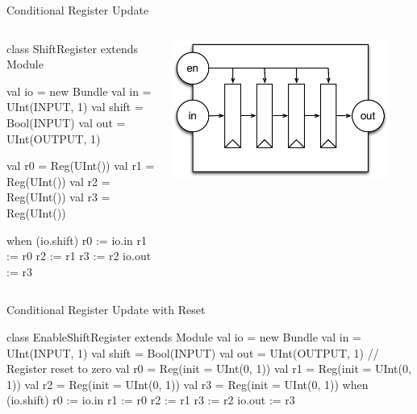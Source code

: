 \documentclass[xcolor=pdflatex,dvipsnames,table]{beamer}
\begin{document}
\begin{frame}[fragile]{Conditional Register Update}

\begin{columns}


\begin{scala}
class ShiftRegister extends Module {
  val io = new Bundle {
    val in    = UInt(INPUT, 1)
    val shift = Bool(INPUT)
    val out   = UInt(OUTPUT, 1)
  }

  val r0 = Reg(UInt())
  val r1 = Reg(UInt())
  val r2 = Reg(UInt())
  val r3 = Reg(UInt())

  when (io.shift) {
    r0 := io.in
    r1 := r0
    r2 := r1
    r3 := r2
  }
  io.out := r3
}
\end{scala}


\begin{center}
\includegraphics[width=0.9\textwidth]{figs/enable-shift-register.pdf}
\end{center}

\end{columns}

\end{frame}

\begin{frame}[fragile]{Conditional Register Update with Reset}

\begin{scala}
class EnableShiftRegister extends Module {
  val io = new Bundle {
    val in    = UInt(INPUT, 1)
    val shift = Bool(INPUT)
    val out   = UInt(OUTPUT, 1)
  }
  // Register reset to zero
  val r0 = Reg(init = UInt(0, 1))
  val r1 = Reg(init = UInt(0, 1))
  val r2 = Reg(init = UInt(0, 1))
  val r3 = Reg(init = UInt(0, 1))
  when (io.shift) {
    r0 := io.in
    r1 := r0
    r2 := r1
    r3 := r2
  }
  io.out := r3
}
\end{scala}

\end{frame}
\end{document}
